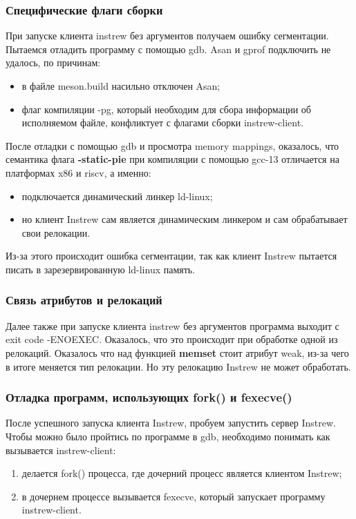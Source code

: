 \subsubsection{Специфические флаги сборки}
При запуске клиента instrew без аргументов получаем ошибку сегментации. Пытаемся отладить программу с помощью gdb. Asan и gprof подключить не удалось, по причинам:
\begin{itemize}
    \item в файле meson.build насильно отключен Asan;
    \item флаг компиляции -pg, который необходим для сбора информации об исполняемом файле, конфликтует с флагами сборки instrew-client.
\end{itemize}
После отладки с помощью gdb и просмотра memory mappings, оказалось, что семантика флага \textbf{-static-pie} при компиляции с помощью gcc-13 отличается на платформах x86 и riscv, а именно:
\begin{itemize}
    \item подключается динамический линкер ld-linux;
    \item но клиент Instrew сам является динамическим линкером и сам обрабатывает свои релокации.
\end{itemize}
Из-за этого происходит ошибка сегментации, так как клиент Instrew пытается писать в зарезервированную ld-linux память.

\subsubsection{Связь атрибутов и релокаций}
Далее также при запуске клиента instrew без аргументов программа выходит с exit code -ENOEXEC. Оказалось, что это происходит при обработке одной из релокаций. Оказалось что над функцией \textbf{memset} стоит атрибут weak, из-за чего в итоге меняется тип релокации. Но эту релокацию Instrew не может обработать.
\subsubsection{Отладка программ, использующих fork() и fexecve()}
После успешного запуска клиента Instrew, пробуем запустить сервер Instrew. Чтобы можно было пройтись по программе в gdb, необходимо понимать как вызывается instrew-client:
\begin{enumerate}
    \item делается fork() процесса, где дочерний процесс является клиентом Instrew;
    \item в дочернем процессе вызывается fexecve, который запускает программу instrew-client.
\end{enumerate}

